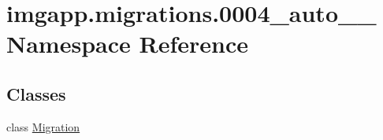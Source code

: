 \hypertarget{namespaceimgapp_1_1migrations_1_10004__auto__20190715__1327}{}\section{imgapp.\+migrations.0004\+\_\+auto\+\_\+\_ Namespace Reference}
\label{namespaceimgapp_1_1migrations_1_10004__auto__20190715__1327}
\subsection*{Classes}
\begin{DoxyCompactItemize}
\item 
class \hyperlink{classimgapp_1_1migrations_1_10004__auto__20190715__1327_1_1Migration}{Migration}
\end{DoxyCompactItemize}
